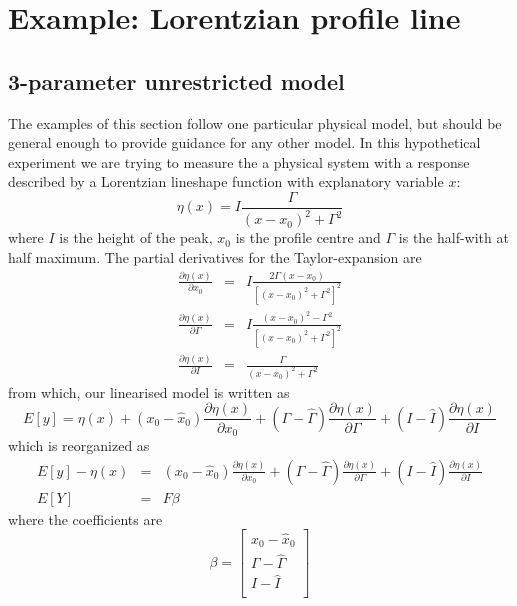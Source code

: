 \documentclass[12pt]{iopart}
\begin{document}
\section{Example: Lorentzian profile line}
\label{seq:example}

\subsection{3-parameter unrestricted model}
\label{seq:exopt}

The examples of this section follow one particular physical model, but should be general enough to provide guidance for any other model.
In this hypothetical experiment we are trying to measure the a physical system with a response described by a Lorentzian lineshape function with explanatory variable $x$:
\begin{equation}
\eta(x) = I \frac{\Gamma}{(x - x_0)^2 + \Gamma^2}
\label{eq:lorentz3}
\end{equation}
where $I$ is the height of the peak, $x_0$ is the profile centre and $\Gamma$ is the half-with at half maximum. The partial derivatives for the Taylor-expansion are
\begin{eqnarray}
\frac{\partial \eta(x)}{\partial x_0} &=& I \frac{2 \Gamma (x - x_0)}{\left[(x - x_0)^2 + \Gamma^2\right]^2} \\
\frac{\partial \eta(x)}{\partial \Gamma} &=& I \frac{(x - x_0)^2 - \Gamma^2}{\left[(x - x_0)^2 + \Gamma^2\right]^2} \\
\frac{\partial \eta(x)}{\partial I} &=& \frac{\Gamma}{(x - x_0)^2 + \Gamma^2}
\end{eqnarray}
from which, our linearised model is written as
\begin{equation}
E[y] = \eta(x) + (x_0 - \hat x_0) \frac{\partial \eta(x)}{\partial x_0} + (\Gamma - \hat \Gamma) \frac{\partial \eta(x)}{\partial \Gamma} + (I - \hat I) \frac{\partial \eta(x)}{\partial I}
\end{equation}
which is reorganized as
\begin{eqnarray}
E[y] - \eta(x) &=& (x_0 - \hat x_0) \frac{\partial \eta(x)}{\partial x_0} + (\Gamma - \hat \Gamma) \frac{\partial \eta(x)}{\partial \Gamma} + (I - \hat I) \frac{\partial \eta(x)}{\partial I}  \nonumber \\
E[Y] &=& F \beta
\end{eqnarray}
where the coefficients are
\begin{equation}
\beta = \left[
  \begin{array}{l}
    x_0 - \hat x_0 \\
    \Gamma - \hat \Gamma\\
    I - \hat I \\
  \end{array} \right ]
\end{equation}
\end{document}
